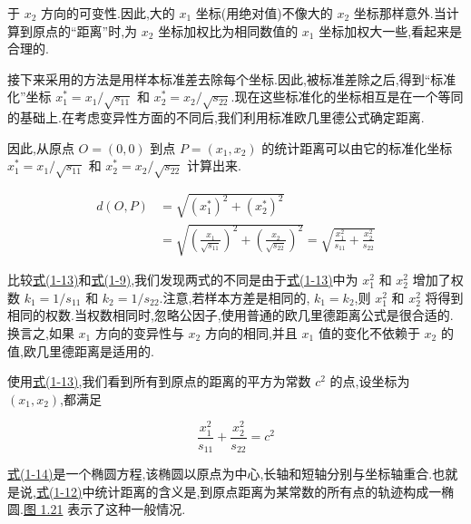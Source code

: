 
于 $x_2$ 方向的可变性.因此,大的 $x_1$ 坐标(用绝对值)不像大的 $x_2$ 坐标那样意外.当计算到原点的“距离”时,为 $x_2$ 坐标加权比为相同数值的 $x_1$ 坐标加权大一些,看起来是合理的.

接下来采用的方法是用样本标准差去除每个坐标.因此,被标准差除之后,得到“标准化”坐标 $x_1^* = x_1/\sqrt{s_{11}}$ 和 $x_2^* = x_2/\sqrt{s_{22}}$.现在这些标准化的坐标相互是在一个等同的基础上.在考虑变异性方面的不同后,我们利用标准欧几里德公式确定距离.

因此,从原点 $O = (0,0)$ 到点 $P = (x_1,x_2)$ 的统计距离可以由它的标准化坐标 $x_1^* = x_1/\sqrt{s_{11}}$ 和 $x_2^* = x_2/\sqrt{s_{22}}$ 计算出来.

\label{eq:1-13}
\begin{equation}
\begin{aligned}
d(O,P) &= \sqrt{(x_1^*)^2 + (x_2^*)^2} \\
&= \sqrt{\left(\frac{x_1}{\sqrt{s_{11}}}\right)^2 + \left(\frac{x_2}{\sqrt{s_{22}}}\right)^2} = \sqrt{\frac{x_1^2}{s_{11}} + \frac{x_2^2}{s_{22}}}
\end{aligned} \tag{1-13}
\end{equation}

比较\hyperref[eq:1-13]{式(1-13)}和\hyperref[eq:1-9]{式(1-9)},我们发现两式的不同是由于\hyperref[eq:1-13]{式(1-13)}中为 $x_1^2$ 和 $x_2^2$ 增加了权数 $k_1 = 1/s_{11}$ 和 $k_2 = 1/s_{22}$.注意,若样本方差是相同的, $k_1 = k_2$,则 $x_1^2$ 和 $x_2^2$ 将得到相同的权数.当权数相同时,忽略公因子,使用普通的欧几里德距离公式是很合适的.换言之,如果 $x_1$ 方向的变异性与 $x_2$ 方向的相同,并且 $x_1$ 值的变化不依赖于 $x_2$ 的值,欧几里德距离是适用的.

使用\hyperref[eq:1-13]{式(1-13)},我们看到所有到原点的距离的平方为常数 $c^2$ 的点,设坐标为 $(x_1,x_2)$,都满足

\label{eq:1-14}
\begin{equation}
\frac{x_1^2}{s_{11}} + \frac{x_2^2}{s_{22}} = c^2 \tag{1-14}
\end{equation}

\hyperref[eq:1-14]{式(1-14)}是一个椭圆方程,该椭圆以原点为中心,长轴和短轴分别与坐标轴重合.也就是说,\hyperref[eq:1-12]{式(1-12)}中统计距离的含义是,到原点距离为某常数的所有点的轨迹构成一椭圆.\hyperref[fig:1.21]{图 1.21} 表示了这种一般情况.

\begin{mvfigure}
\label{fig:1.21}
\end{mvfigure}

